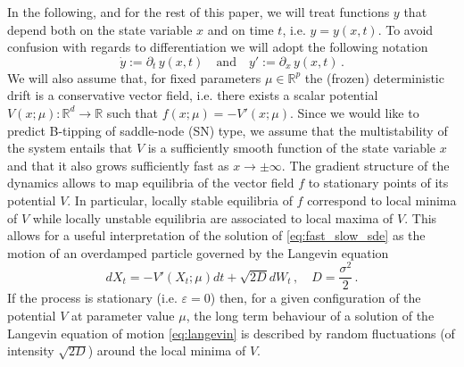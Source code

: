 \documentclass[10pt]{article}
\begin{document}
In the following, and for the rest of this paper, we will treat functions $y$ that depend both on the state variable $x$ and on time $t$, i.e. $y=y(x,t)$.
To avoid confusion with regards to differentiation we will adopt the following notation
%
\begin{equation*}
        \dot{y}:=\partial_t\,y(x,t)\quad \text{and}\quad y':=\partial_x\,y(x,t)\,.
\end{equation*}
%
We will also assume that, for fixed parameters $\mu\in \mathbb{R}^{p}$ the (frozen) deterministic drift is a conservative vector field, i.e. there exists a scalar potential $V(x;\mu):\mathbb{R}^{d}\to \mathbb{R}$ such that $f(x;\mu) = -V'(x;\mu)$.
Since we would like to predict B-tipping of saddle-node (SN) type, we assume that the multistability of the system entails that $V$ is a sufficiently smooth function of the state variable $x$ and that it also grows sufficiently fast as $x\to\pm\infty$.
The gradient structure of the dynamics allows to map equilibria of the vector field $f$ to stationary points of its potential $V$.
In particular, locally stable equilibria of $f$ correspond to local minima of $V$ while locally unstable equilibria are associated to local maxima of $V$.
This allows for a useful interpretation of the solution of \eqref{eq:fast_slow_sde} as the motion of an overdamped particle governed by the Langevin equation
%
\begin{equation}\label{eq:langevin}
        dX_{t} = -V'(X_{t};\mu)dt + \sqrt{2D}dW_{t}\,,\quad D=\frac{\sigma^{2}}{2}\,.
\end{equation}
%
If the process is stationary (i.e. $\varepsilon=0$) then, for a given configuration of the potential $V$ at parameter value $\mu$, the long term behaviour of a solution of the Langevin equation of motion \eqref{eq:langevin} is described by random fluctuations (of intensity $\sqrt{2D}$) around the local minima of $V$.
%
\end{document}
